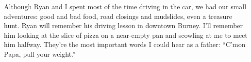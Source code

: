 \documentclass[12pt]{book}
\begin{document}
Although Ryan and I spent most of the time driving in the car, we had our small adventures: good and bad food, road closings and mudslides, even a treasure hunt. Ryan will remember his driving lesson in downtown Burney. I'll remember him looking at the slice of pizza on a near-empty pan and scowling at me to meet him halfway. They're the most important words I could hear as a father: ``C'mon Papa, pull your weight.''
\end{document}
